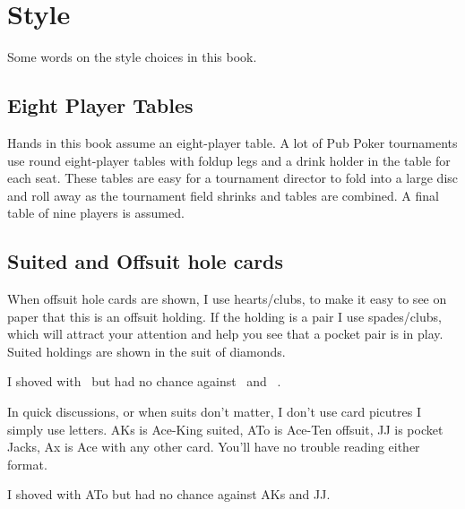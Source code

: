 \chapter{Style}


Some words on the style choices in this book.

\section*{Eight Player Tables}

Hands in this book assume an eight-player table. A lot of Pub
Poker tournaments use round eight-player tables with foldup legs and a
drink holder in the table for each seat. These tables are easy for a
tournament director to fold into a large disc and roll away as the
tournament field shrinks and tables are combined. A final table of
nine players is assumed.

\section*{Suited and Offsuit hole cards}

When offsuit hole cards are shown, I use hearts/clubs, to make
it easy to see on paper that this is an offsuit holding. If the
holding is a pair I use spades/clubs, which will
attract your attention and help you see that a pocket pair is in play.
Suited holdings are shown in the suit of diamonds.

I shoved with \Ah\tenc\ but had no chance against \Ad\Kd\ and \Js\Jc\ .

In quick discussions, or when suits don't matter, I don't use card
picutres I simply use letters. AKs is Ace-King suited, ATo is Ace-Ten
offsuit, JJ is pocket Jacks, Ax is Ace with any other card. You'll
have no trouble reading either format.

I shoved with ATo but had no chance against AKs and JJ.



